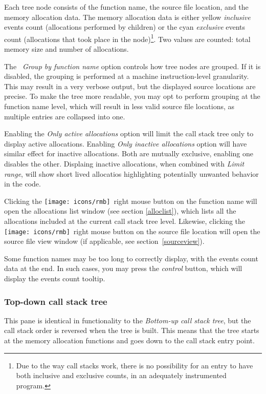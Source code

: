 \documentclass[hidelinks,titlepage,a4paper,twoside]{article}
\newcommand{\RMB}{\texttt{[image: icons/rmb]}}
\begin{document}
Each tree node consists of the function name, the source file location, and the memory allocation data. The memory allocation data is either yellow \emph{inclusive} events count (allocations performed by children) or the cyan \emph{exclusive} events count (allocations that took place in the node)\footnote{Due to the way call stacks work, there is no possibility for an entry to have both inclusive and exclusive counts, in an adequately instrumented program.}. Two values are counted: total memory size and number of allocations.

The \emph{\faLayerGroup{}~Group by function name} option controls how tree nodes are grouped. If it is disabled, the grouping is performed at a machine instruction-level granularity. This may result in a very verbose output, but the displayed source locations are precise. To make the tree more readable, you may opt to perform grouping at the function name level, which will result in less valid source file locations, as multiple entries are collapsed into one.

Enabling the \emph{Only active allocations} option will limit the call stack tree only to display active allocations. Enabling \emph{Only inactive allocations} option will have similar effect for inactive allocations. Both are mutually exclusive, enabling one disables the other. Displaing inactive allocations, when combined with \emph{Limit range}, will show short lived allocatios highlighting potentially unwanted behavior in the code.

Clicking the \RMB{}~right mouse button on the function name will open the allocations list window (see section \ref{alloclist}), which lists all the allocations included at the current call stack tree level. Likewise, clicking the \RMB{}~right mouse button on the source file location will open the source file view window (if applicable, see section~\ref{sourceview}).

Some function names may be too long to correctly display, with the events count data at the end. In such cases, you may press the \emph{control} button, which will display the events count tooltip.

\subsubsection{Top-down call stack tree}

This pane is identical in functionality to the \emph{Bottom-up call stack tree}, but the call stack order is reversed when the tree is built. This means that the tree starts at the memory allocation functions and goes down to the call stack entry point.
\end{document}
